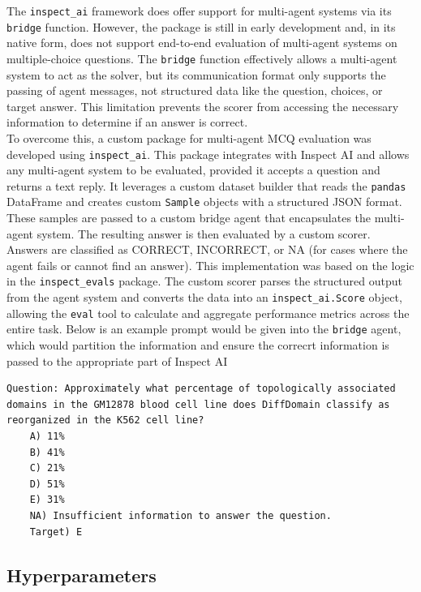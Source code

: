The \texttt{inspect\_ai} framework does offer support for multi-agent systems via its \texttt{bridge} function. However, the package is still in early development and, in its native form, does not support end-to-end evaluation of multi-agent systems on multiple-choice questions. The \texttt{bridge} function effectively allows a multi-agent system to act as the solver, but its communication format only supports the passing of agent messages, not structured data like the question, choices, or target answer. 
This limitation prevents the scorer from accessing the necessary information to determine if an answer is correct. \\

To overcome this, a custom package for multi-agent MCQ evaluation was developed using \texttt{inspect\_ai}. This package integrates with Inspect AI and allows any multi-agent system to be evaluated, provided it accepts a question and returns a text reply. 
It leverages a custom dataset builder that reads the \texttt{pandas} DataFrame and creates custom \texttt{Sample} objects with a structured JSON format. These samples are passed to a custom bridge agent that encapsulates the multi-agent system. The resulting answer is then evaluated by a custom scorer. Answers are classified as CORRECT, INCORRECT, or NA (for cases where the agent fails or cannot find an answer). This implementation was based on the logic in the \texttt{inspect\_evals} package. The custom scorer parses the structured output from the agent system and converts the data into an \texttt{inspect\_ai.Score} object, allowing the \texttt{eval} tool to calculate and aggregate performance metrics across the entire task. Below is an example prompt would be given into the \texttt{bridge} agent, which would partition the information and ensure the correcrt information is passed to the appropriate part of Inspect AI\\

\begin{verbatim}
Question: Approximately what percentage of topologically associated 
domains in the GM12878 blood cell line does DiffDomain classify as 
reorganized in the K562 cell line? 
    A) 11%
    B) 41%
    C) 21%
    D) 51%
    E) 31%
    NA) Insufficient information to answer the question.
    Target) E
\end{verbatim}



\subsection{Hyperparameters}

